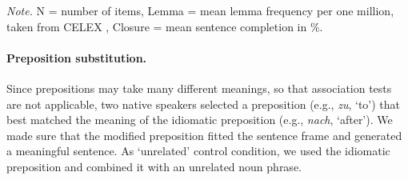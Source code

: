 \begin{table}[]
\caption{\textit{Idiomatic Sentences and Stimulus Characteristics of the Idiomatic and Modified Preposition, and Unrelated Prepositional Phrase in Experiment 3.}}
\label{tab:Table6}
\footnotesize{\textit{Note.} N = number of items, Lemma = mean lemma frequency per one million, taken from CELEX \citep{baayen:1993}, Closure = mean sentence completion in \%.}
\end{table}

\paragraph{Preposition substitution.}
Since prepositions may take many different meanings, so that association tests are not applicable, two native speakers selected a preposition (e.g., \textit{zu}, ‘to’) that best matched the meaning of the idiomatic preposition (e.g., \textit{nach}, ‘after’). We made sure that the modified preposition fitted the sentence frame and generated a meaningful sentence. As ‘unrelated’ control condition, we used the idiomatic preposition and combined it with an unrelated noun phrase. 

